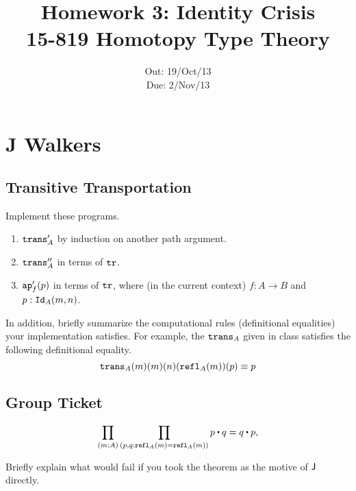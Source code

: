 \documentclass[12pt]{article}
\title{\Large\textbf{
  Homework 3: Identity Crisis}
\normalsize\\
15-819 Homotopy Type Theory}
\author{}
\date{%
Out: 19/Oct/13\\
Due: 2/Nov/13
}
\begin{document}
\maketitle

\section{J Walkers}

\subsection{Transitive Transportation}

\begin{task}
  Implement these programs.
  \begin{enumerate}
    \item $\mathtt{trans}'_A$ by induction on another path argument.
    \item $\mathtt{trans}''_A$ in terms of $\mathtt{tr}$.
    \item
      $\mathtt{ap}'_f(p)$ in terms of $\mathtt{tr}$,
      where (in the current context) $f : A \to B$
      and $p : \mathtt{Id}_A(m,n)$.
  \end{enumerate}
  In addition, briefly summarize the computational rules
  (definitional equalities)
  your implementation satisfies.
  For example, the $\mathtt{trans}_A$ given in class
  satisfies the following definitional equality.
  \[
    \mathtt{trans}_A(m)(m)(n)(\mathtt{refl}_A(m))(p) \equiv p
  \]
\end{task}

\subsection{Group Ticket}

\[
  \prod_{(m{:}A)}\prod_{(p,q{:}\refl_A(m)=\refl_A(m))}p\concat q = q\concat p,
\]
\begin{bonus}
Briefly explain what would fail if you took the theorem as the motive of $\mathsf{J}$ directly.
\end{bonus}
\end{document}
